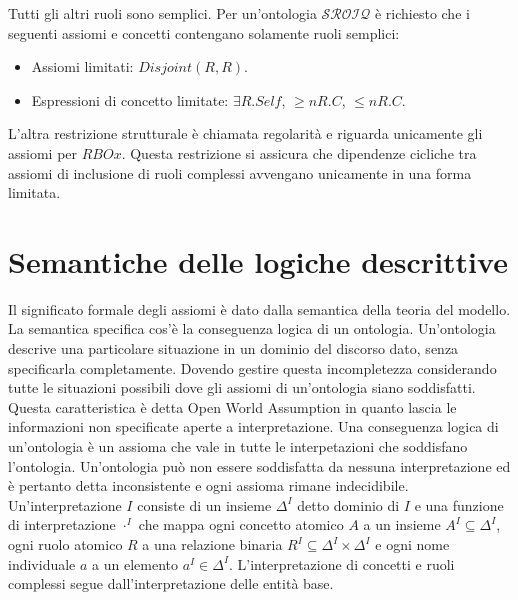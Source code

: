 Tutti gli altri ruoli sono semplici. Per un'ontologia $\mathcal{SROIQ}$ \`e richiesto che i seguenti assiomi e concetti contengano solamente ruoli semplici:
\begin{itemize}
\item Assiomi limitati: $Disjoint(R,R)$.
\item Espressioni di concetto limitate: $\exists R.Self$, $\ge n R.C$, $\le n R.C$.
\end{itemize}
L'altra restrizione strutturale \`e chiamata regolarit\`a e riguarda unicamente gli assiomi per $RBOx$. Questa restrizione si assicura che dipendenze cicliche tra assiomi di inclusione di ruoli complessi avvengano
unicamente in una forma limitata. 
\section{Semantiche delle logiche descrittive}
Il significato formale degli assiomi \`e dato dalla semantica della teoria del modello. La semantica specifica cos'\`e la conseguenza logica di un ontologia. Un'ontologia descrive una particolare 
situazione in un dominio del discorso dato, senza specificarla completamente. Dovendo gestire questa incompletezza considerando tutte le situazioni possibili dove gli assiomi di un'ontologia siano soddisfatti.
Questa caratteristica \`e detta Open World Assumption in quanto lascia le informazioni non specificate aperte a interpretazione. Una conseguenza logica di un'ontologia \`e un assioma che vale in tutte le 
interpetazioni che soddisfano l'ontologia. Un'ontologia pu\`o non essere soddisfatta da nessuna interpretazione ed \`e pertanto detta inconsistente e ogni assioma rimane indecidibile. Un'interpretazione
$I$ consiste di un insieme $\Delta^I$ detto dominio di $I$ e una funzione di interpretazione $\cdot^I$ che mappa ogni concetto atomico $A$ a un insieme $A^I\subseteq\Delta^I$, ogni ruolo atomico $R$ a
una relazione binaria $R^I\subseteq\Delta^I\times\Delta^I$ e ogni nome individuale $a$ a un elemento $a^I\in\Delta^I$. L'interpretazione di concetti e ruoli complessi segue dall'interpretazione delle entit\`a
base. 